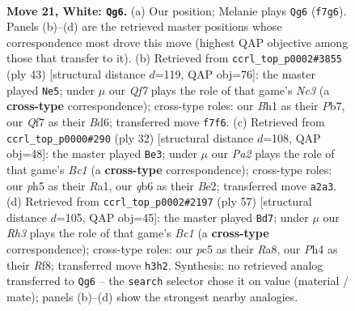 \documentclass[11pt]{article}
\begin{document}
\clearpage

\begin{figure}[p]\centering
\begin{subfigure}{0.46\textwidth}\centering
\resizebox{\linewidth}{!}{%
\newchessgame
\chessboard[
  setfen={3k2nr/1br2Qp1/pq1b4/2p3Pp/5P1P/2P4R/PP6/RNB1K2B w Q - 1 21},
  showmover=false,
  pgfstyle=straightmove, color=movearrow, markmove={f7-g6}
]}
\caption{}
\end{subfigure}\hfill
\begin{subfigure}{0.46\textwidth}\centering
\resizebox{\linewidth}{!}{%
\newchessgame
\chessboard[
  setfen={r1b2rk1/1p3ppp/2nb4/P2Q2B1/1p6/1NqB2P1/5P1P/1R2R1K1 b - - 3 22},
  showmover=false,
  pgfstyle=straightmove, color=movearrow, markmove={c6-e5}
]}
\caption{}
\end{subfigure}
\\[4pt]
\begin{subfigure}{0.46\textwidth}\centering
\resizebox{\linewidth}{!}{%
\newchessgame
\chessboard[
  setfen={r1b2rk1/1p2b1pp/2q1p3/pN2Qp2/2P1n3/P7/1P2BPPP/R1BR2K1 w - - 0 17},
  showmover=false,
  pgfstyle=straightmove, color=movearrow, markmove={c1-e3}
]}
\caption{}
\end{subfigure}\hfill
\begin{subfigure}{0.46\textwidth}\centering
\resizebox{\linewidth}{!}{%
\newchessgame
\chessboard[
  setfen={r1b2r1k/pp4pp/4p3/3nP3/1P2Bpq1/1Q1R4/P2B1PP1/4R1K1 b - - 6 29},
  showmover=false,
  pgfstyle=straightmove, color=movearrow, markmove={c8-d7}
]}
\caption{}
\end{subfigure}
\caption{\textbf{Move 21, White: \texttt{Qg6}.} (a) Our position; Melanie plays \texttt{Qg6} (\texttt{f7g6}). Panels (b)--(d) are the retrieved master positions whose correspondence most drove this move (highest QAP objective among those that transfer to it). (b) Retrieved from \texttt{ccrl\_top\_p0002\#3855} (ply 43) [structural distance $d$=119, QAP obj=76]: the master played \texttt{Ne5}; under $\mu$ our \emph{Qf7} plays the role of that game's \emph{Nc3} (a \textbf{cross-type} correspondence); cross-type roles: our \emph{B}h1 as their \emph{P}b7, our \emph{Q}f7 as their \emph{B}d6; transferred move \texttt{f7f6}. (c) Retrieved from \texttt{ccrl\_top\_p0000\#290} (ply 32) [structural distance $d$=108, QAP obj=48]: the master played \texttt{Be3}; under $\mu$ our \emph{Pa2} plays the role of that game's \emph{Bc1} (a \textbf{cross-type} correspondence); cross-type roles: our \emph{p}h5 as their \emph{R}a1, our \emph{q}b6 as their \emph{B}e2; transferred move \texttt{a2a3}. (d) Retrieved from \texttt{ccrl\_top\_p0002\#2197} (ply 57) [structural distance $d$=105, QAP obj=45]: the master played \texttt{Bd7}; under $\mu$ our \emph{Rh3} plays the role of that game's \emph{Bc1} (a \textbf{cross-type} correspondence); cross-type roles: our \emph{p}c5 as their \emph{R}a8, our \emph{P}h4 as their \emph{R}f8; transferred move \texttt{h3h2}. Synthesis: no retrieved analog transferred to \texttt{Qg6} -- the \texttt{search} selector chose it on value (material / mate); panels (b)--(d) show the strongest nearby analogies.}
\label{fig:thought-m40}
\end{figure}
\end{document}
